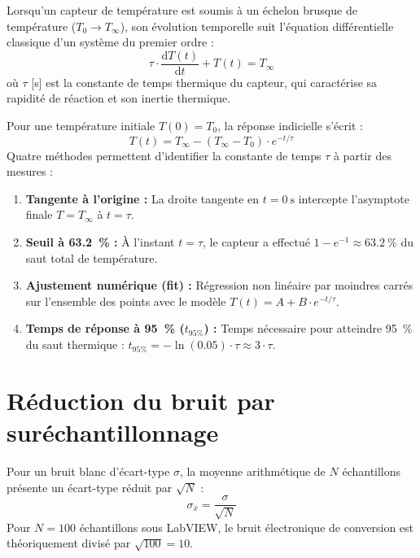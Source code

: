 Lorsqu'un capteur de température est soumis à un échelon brusque de température ($T_0 \to T_\infty$), son évolution temporelle suit l'équation différentielle classique d'un système du premier ordre :
\begin{equation}
    \tau \cdot \frac{\mathrm{d}T(t)}{\mathrm{d}t} + T(t) = T_\infty
    \label{eq:theorie_equa_diff}
\end{equation}
où $\tau$ [\unit{\second}] est la constante de temps thermique du capteur, qui caractérise sa rapidité de réaction et son inertie thermique.

Pour une température initiale $T(0) = T_0$, la réponse indicielle s'écrit :
\begin{equation}
    T(t) = T_\infty - (T_\infty - T_0) \cdot e^{-t/\tau}
    \label{eq:theorie_solution_indicielle}
\end{equation}
Quatre méthodes permettent d'identifier la constante de temps $\tau$ à partir des mesures :
\begin{enumerate}[leftmargin=1.2cm,topsep=2pt,itemsep=1pt]
    \item \textbf{Tangente à l'origine :} La droite tangente en $t = \qty{0}{\second}$ intercepte l'asymptote finale $T = T_\infty$ à $t = \tau$.
    \item \textbf{Seuil à \qty{63.2}{\percent} :} À l'instant $t = \tau$, le capteur a effectué $1 - e^{-1} \approx \qty{63.2}{\percent}$ du saut total de température.
    \item \textbf{Ajustement numérique (fit) :} Régression non linéaire par moindres carrés sur l'ensemble des points avec le modèle $T(t) = A + B \cdot e^{-t/\tau}$.
    \item \textbf{Temps de réponse à \qty{95}{\percent} ($t_{95\%}$) :} Temps nécessaire pour atteindre \qty{95}{\percent} du saut thermique : $t_{95\%} = -\ln(0.05) \cdot \tau \approx 3 \cdot \tau$.
\end{enumerate}

\section{Réduction du bruit par suréchantillonnage}
\label{sec:theorie_oversampling}

Pour un bruit blanc d'écart-type $\sigma$, la moyenne arithmétique de $N$ échantillons présente un écart-type réduit par $\sqrt{N}$ :
\begin{equation}
    \sigma_{\bar{x}} = \frac{\sigma}{\sqrt{N}}
    \label{eq:theorie_reduction_bruit}
\end{equation}
Pour $N = 100$ échantillons sous LabVIEW, le bruit électronique de conversion est théoriquement divisé par $\sqrt{100} = 10$.
